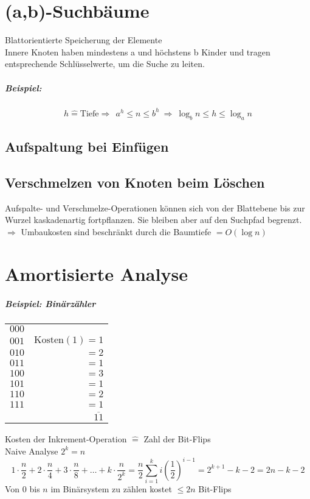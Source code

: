 \chapter{(a,b)-Suchbäume}
Blattorientierte Speicherung der Elemente\\
Innere Knoten haben mindestens a und höchstens b Kinder und tragen entsprechende Schlüsselwerte, um die Suche zu leiten.
\paragraph{Beispiel:}%
\[h\hat{=}\text{Tiefe}\Rightarrow ~~ a^h\leq n \leq b^h ~\Rightarrow ~ \log_b n \leq h \leq \log_a n\]
\section{Aufspaltung bei Einfügen}
\section{Verschmelzen von Knoten beim Löschen}
Aufspalte- und Verschmelze-Operationen können sich von der Blattebene bis zur Wurzel kaskadenartig fortpflanzen. Sie bleiben aber auf den Suchpfad begrenzt.\\
$\Rightarrow$ Umbaukosten sind beschränkt durch die Baumtiefe $=O(\log n)$
\chapter{Amortisierte Analyse}
\paragraph{Beispiel: Binärzähler}
	\begin{tabular}{lr}
		$000$& \\
		$001$&$\text{Kosten}(1)=1$\\
		$010$&$=2$\\
		$011$&$=1$\\
		$100$&$=3$\\
		$101$&$=1$\\
		$110$&$=2$\\
		$111$&$=1$\\
		 &$\overline{11}$
	\end{tabular}
	Kosten der Inkrement-Operation $\hat{=}$ Zahl der Bit-Flips\\
	Naive Analyse $2^k=n$
	\[1\cdot\frac{n}{2}+2\cdot\frac{n}{4}+3\cdot\frac{n}{8}+\ldots+k\cdot\frac{n}{2^k}=\frac{n}{2}\sum_{i=1}^{k}i(\frac{1}{2})^{i-1}=2^{k+1}-k-2=2n-k-2 \]
Von $0$ bis $n$ im Binärsystem zu zählen kostet  $\leq 2n$ Bit-Flips
